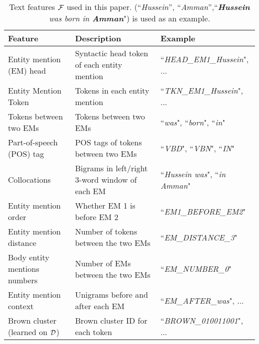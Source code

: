
\begin{table*}
\begin{center}
\begin{small}
\begin{tabular}{lll}
\hline
\textbf{Feature} & \textbf{Description} & \textbf{Example} \\
\hline
Entity mention (EM) head & Syntactic head token of each entity mention & ``\textit{HEAD\_EM1\_Hussein}", ...%
\\ %
Entity Mention Token & Tokens in each entity mention & ``\textit{TKN\_EM1\_Hussein}", ...%
\\ %
Tokens between two EMs & Tokens between two EMs & ``\textit{was}", ``\textit{born}", ``\textit{in}"
\\
Part-of-speech (POS) tag & POS tags of tokens between two EMs & ``\textit{VBD}", ``\textit{VBN}", ``\textit{IN}"
\\ %
Collocations & Bigrams in left/right 3-word window of each EM & ``\textit{Hussein was}", ``\textit{in Amman}" 
\\ %
Entity mention order & Whether EM 1 is before EM 2 & ``\textit{EM1\_BEFORE\_EM2}"\\ %
Entity mention distance & Number of tokens between the two EMs & ``\textit{EM\_DISTANCE\_3}" \\ %
Body entity mentions numbers& Number of EMs between the two EMs & ``\textit{EM\_NUMBER\_0}" \\ %
Entity mention context & Unigrams before and after each EM & ``\textit{EM\_AFTER\_was}", ... \\ %
Brown cluster (learned on $\mathcal{D}$) & Brown cluster ID for each token  & ``\textit{BROWN\_010011001}", ... \\ %
\hline
\end{tabular}
\end{small}
\caption{ \small Text features $\mathcal{F}$ used in this paper. (``\textit{Hussein}'', ``\textit{Amman}'',``\textit{\textbf{Hussein} was born in \textbf{Amman}}") is used as an example.}
\label{table:features}
\end{center}
\end{table*}
